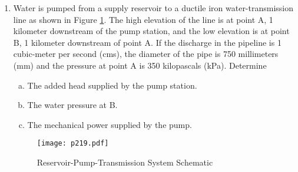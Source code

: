 \documentclass[12pt]{article}
\begin{document}
\begin{enumerate}
\item  Water is pumped from a supply reservoir to a ductile iron water-transmission line as shown in Figure \ref{fig:p219}.   The high elevation of the line is at point A, 1 kilometer downstream of the pump station, and the low elevation is at point B, 1 kilometer downstream of point A.  If the discharge in the pipeline is 1 cubic-meter per second (cms), the diameter of the pipe is 750 millimeters (mm) and the pressure at point A is 350 kilopascals (kPa).  Determine

\begin{enumerate}[(a)]
\item The added head supplied by the pump station.
\item The water pressure at B.
\item The mechanical power supplied by the pump.
\end{enumerate}

\begin{figure}[htbp] %
   \centering
   \texttt{[image: p219.pdf]} 
   \caption{Reservoir-Pump-Transmission System Schematic}
   \label{fig:p219}
\end{figure}

\end{enumerate}
\end{document}
